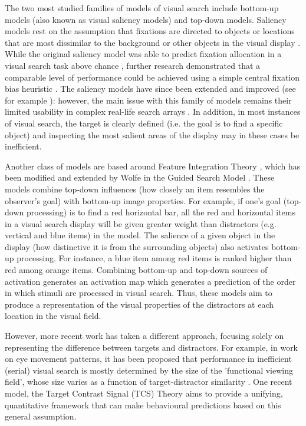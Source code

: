 \documentclass[smallextended, natbib]{svjour3}       %
\begin{document}
The two most studied families of models of visual search include bottom-up models (also known as visual saliency models) and top-down models. Saliency models rest on the assumption that fixations are directed to objects or locations that are most dissimilar to the background or other objects in the visual display \cite{itti2000saliency, itti1998model, koch1987shifts}. While the original saliency model was able to predict fixation allocation in a visual search task above chance \cite{parkhurst2002modeling}, further research demonstrated that a comparable level of performance could be achieved using a simple central fixation bias heuristic \cite{tatler2007central}. The saliency models have since been extended and improved (see for example \cite{zhang2008sun}): however, the main issue with this family of models remains their limited usability in complex real-life search arrays \cite{tatler2011eye, koehler2014saliency}. In addition, in most instances of visual search, the target is clearly defined (i.e. the goal is to find a specific object) and inspecting the most salient areas of the display may in these cases be inefficient.

Another class of models are based around Feature Integration Theory \cite{treisman1980feature}, which has been modified and extended by Wolfe in the Guided Search Model \cite{wolfe1989guided,wolfe2014approaches}. These models combine top-down influences (how closely an item resembles the observer's goal) with bottom-up image properties. For example, if one's goal (top-down processing) is to find a red horizontal bar, all the red and horizontal items in a visual search display will be given greater weight than distractors (e.g. vertical and blue items) in the model. The salience of a given object in the display (how distinctive it is from the surrounding objects) also activates bottom-up processing. For instance, a blue item among red items is ranked higher than red among orange items. Combining bottom-up and top-down sources of activation generates an activation map which generates a prediction of the order in which stimuli are processed in visual search. Thus, these models aim to produce a representation of the visual properties of the distractors at each location in the visual field. 
 
However, more recent work has taken a different approach, focusing solely on representing the difference between targets and distractors. For example, in work on eye movement patterns, it has been proposed that performance in inefficient (serial) visual search is mostly determined by the size of the 'functional viewing field', whose size varies as a function of target-distractor similarity \cite{hulleman2017brink}. One recent model, the Target Contrast Signal (TCS) Theory \cite{lleras2020target} aims to provide a unifying, quantitative framework that can make behavioural predictions based on this general assumption.
\end{document}
